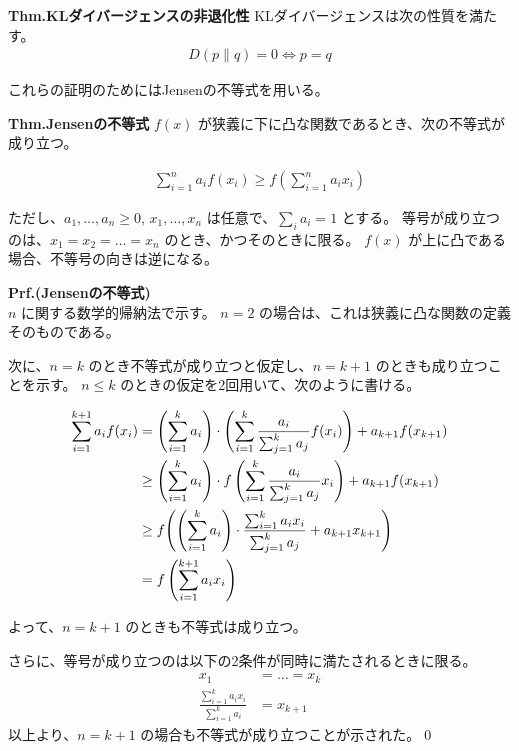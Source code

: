 \documentclass[a4paper,11pt]{jsarticle}
\numberwithin{equation}{section}
\begin{document}
\begin{itembox}[l]{\textbf{Thm.KLダイバージェンスの非退化性}}
    KLダイバージェンスは次の性質を満たす。
    \begin{align}
D(p \| q) = 0 \Leftrightarrow p = q
\end{align}
\end{itembox}
これらの証明のためにはJensenの不等式を用いる。

\begin{itembox}[l]{\textbf{Thm.Jensenの不等式}}
    $f(x)$ が狭義に下に凸な関数であるとき、次の不等式が成り立つ。

\begin{align}
\sum_{i=1}^n a_i f(x_i) \geq f\left( \sum_{i=1}^n a_i x_i \right)
\end{align}

ただし、$a_1, \dots, a_n \geq 0$, $x_1, \dots, x_n$ は任意で、$\sum_i a_i = 1$ とする。  
等号が成り立つのは、$x_1 = x_2 = \dots = x_n$ のとき、かつそのときに限る。  
$f(x)$ が上に凸である場合、不等号の向きは逆になる。
\end{itembox}
\textbf{Prf.(Jensenの不等式)}\\
$n$ に関する数学的帰納法で示す。
$n = 2$ の場合は、これは狭義に凸な関数の定義そのものである。

次に、$n = k$ のとき不等式が成り立つと仮定し、$n = k + 1$ のときも成り立つことを示す。  
$n \leq k$ のときの仮定を2回用いて、次のように書ける。

\begin{align}
\sum_{i=1}^{k+1} a_i f(x_i)
&= \left( \sum_{i=1}^{k} a_i \right)
\cdot \left( \sum_{i=1}^{k} \frac{a_i}{\sum_{j=1}^{k} a_j} f(x_i) \right)
+ a_{k+1} f(x_{k+1}) \\
&\geq \left( \sum_{i=1}^{k} a_i \right)
\cdot f\left( \sum_{i=1}^{k} \frac{a_i}{\sum_{j=1}^{k} a_j} x_i \right)
+ a_{k+1} f(x_{k+1}) \\
&\geq f\qty(\qty(\sum_{i=1}^{k} a_i) \cdot \frac{\sum_{i=1}^{k} a_i x_i}{\sum_{j=1}^{k} a_j} + a_{k+1} x_{k+1}) \\
&= f\left( \sum_{i=1}^{k+1} a_i x_i \right)
\end{align}

よって、$n = k + 1$ のときも不等式は成り立つ。

さらに、等号が成り立つのは以下の2条件が同時に満たされるときに限る。
\begin{align}
x_1 &= \dots = x_k \\
\frac{\sum_{i=1}^{k} a_i x_i}{\sum_{i=1}^{k} a_i} &= x_{k+1}
\end{align}
以上より、$n = k + 1$ の場合も不等式が成り立つことが示された。\qed\\
\end{document}
